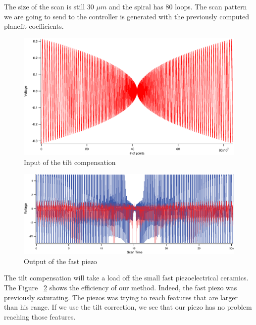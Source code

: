 The size of the scan is still 30 $\mu m$ and the spiral has 80 loops. The scan pattern we are going to send to the controller is generated with the previously computed planefit coefficients. 

\begin{figure}[H]
  \centering
  \includegraphics[scale=0.1]{images/spiralztiltout.eps}
    \caption{Input of the tilt compensation}
  \label{spiralztiltout}
\end{figure}



\begin{figure}[H]
  \centering
  \includegraphics[scale=0.1]{images/tiltcorrectiongraph.eps}
    \caption{Output of the fast piezo}
  \label{spiralzfast}
\end{figure}


The tilt compensation will take a load off the small fast piezoelectrical ceramics. The Figure ~\ref{spiralzfast} shows the efficiency of our method. Indeed, the fast piezo was previously saturating. The piezos was trying to reach features that are larger than his range. If we use the tilt correction, we see that our piezo has no problem reaching those features.
